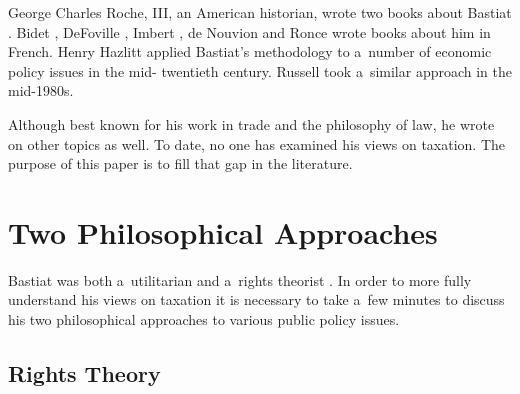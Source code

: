 George Charles Roche, III, an American historian, wrote two books about Bastiat 
\parencites[][]{roche_frederic_1971}[][]{roche_free_1993}. %
 Bidet 
\parencite*[][]{bidet_frederic_1906}, %
 DeFoville 
\parencite*[][]{}, %
 Imbert 
\parencite*[][]{imbert_frederic_1913}, %
 de Nouvion 
\parencite*[][]{} %
 and Ronce 
\parencite*[][]{} %
 wrote books about him in French. Henry Hazlitt 
\parencites*[][]{hazlitt_economics_1946}[][]{hazlitt_economics_1979} %
 applied Bastiat's methodology to a~number of economic policy issues in the mid- twentieth century. Russell 
\parencite*[][]{russell_government_1985} %
 took a~similar approach in the mid-1980s.



Although best known for his work in trade and the philosophy of law, he wrote on other topics as well. To date, no one has examined his views on taxation. The purpose of this paper is to fill that gap in the literature.



\section{Two Philosophical Approaches}

Bastiat was both a~utilitarian 
\parencites[][]{bastiat_ce_1850}[][]{bastiat_libre-echange_1862}[][]{bastiat_cobden_1864}[][]{bastiat_harmonies_1870}[][]{bastiat_ce_1873}[][]{bastiat_sophismes_1873}[][]{bastiat_economic_1964}[][]{bastiat_economic_1964-1}[][]{bastiat_selected_1964}[][]{bastiat_bastiat_2007}[][]{bastiat_collected_2010} %
 and a~rights theorist 
\parencites[][pp.342–393]{bastiat_ce_1873}[][]{bastiat_law_1998}[][]{}. %
 In order to more fully understand his views on taxation it is necessary to take a~few minutes to discuss his two philosophical approaches to various public policy issues.



\subsection{Rights Theory }



